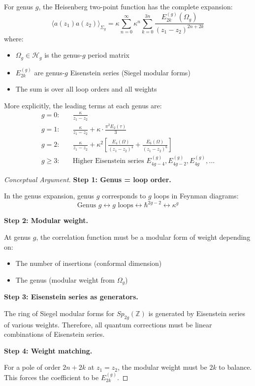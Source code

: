 \begin{theorem}\label{thm:heisenberg-all-genus}
For genus $g$, the Heisenberg two-point function has the complete expansion:
\begin{equation}
\langle a(z_1) a(z_2) \rangle_{\Sigma_g} = \kappa \sum_{n=0}^{\infty} 
\kappa^n \sum_{k=0}^{3n} \frac{E_{2k}^{(g)}(\Omega_g)}{(z_1-z_2)^{2n+2k}}
\end{equation}
where:
\begin{itemize}
\item $\Omega_g \in \mathcal{H}_g$ is the genus-$g$ period matrix
\item $E_{2k}^{(g)}$ are genus-$g$ Eisenstein series (Siegel modular forms)
\item The sum is over all loop orders and all weights
\end{itemize}

More explicitly, the leading terms at each genus are:
\begin{align}
g=0: \quad & \frac{\kappa}{z_1-z_2} \\
g=1: \quad & \frac{\kappa}{z_1-z_2} + \kappa \cdot \frac{\pi^2 E_2(\tau)}{3} \\
g=2: \quad & \frac{\kappa}{z_1-z_2} + \kappa^2 \left[\frac{E_4(\Omega)}{(z_1-z_2)^4} 
+ \frac{E_6(\Omega)}{(z_1-z_2)^6}\right] \\
g \geq 3: \quad & \text{Higher Eisenstein series } E_{4g-4}^{(g)}, E_{4g-2}^{(g)}, 
E_{4g}^{(g)}, \ldots
\end{align}
\end{theorem}

\begin{proof}[Conceptual Argument]

\textbf{Step 1: Genus = loop order.}

In the genus expansion, genus $g$ corresponds to $g$ loops in Feynman diagrams:
$$\text{Genus } g \leftrightarrow g \text{ loops} \leftrightarrow \hbar^{2g-2} 
\leftrightarrow \kappa^g$$

\textbf{Step 2: Modular weight.}

At genus $g$, the correlation function must be a modular form of weight depending on:
\begin{itemize}
\item The number of insertions (conformal dimension)
\item The genus (modular weight from $\Omega_g$)
\end{itemize}

\textbf{Step 3: Eisenstein series as generators.}

The ring of Siegel modular forms for $Sp_{2g}(\mathbb{Z})$ is generated by 
Eisenstein series of various weights. Therefore, all quantum corrections must be 
linear combinations of Eisenstein series.

\textbf{Step 4: Weight matching.}

For a pole of order $2n+2k$ at $z_1 = z_2$, the modular weight must be $2k$ to 
balance. This forces the coefficient to be $E_{2k}^{(g)}$.
\end{proof}

